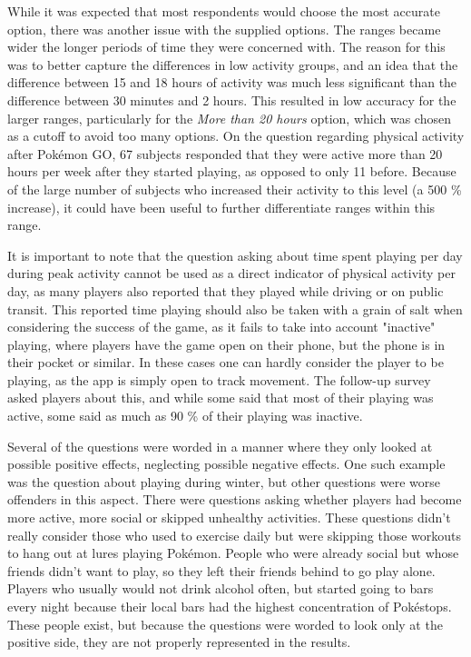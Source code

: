 While it was expected that most respondents would choose the most accurate option, there was another issue with the supplied options. The ranges became wider the longer periods of time they were concerned with. The reason for this was to better capture the differences in low activity groups, and an idea that the difference between 15 and 18 hours of activity was much less significant than the difference between 30 minutes and 2 hours. This resulted in low accuracy for the larger ranges, particularly for the \emph{More than 20 hours} option, which was chosen as a cutoff to avoid too many options. On the question regarding physical activity after Pokémon GO, 67 subjects responded that they were active more than 20 hours per week after they started playing, as opposed to only 11 before. Because of the large number of subjects who increased their activity to this level (a 500 \% increase), it could have been useful to further differentiate ranges within this range. 

It is important to note that the question asking about time spent playing per day during peak activity cannot be used as a direct indicator of physical activity per day, as many players also reported that they played while driving or on public transit. This reported time playing should also be taken with a grain of salt when considering the success of the game, as it fails to take into account "inactive" playing, where players have the game open on their phone, but the phone is in their pocket or similar. In these cases one can hardly consider the player to be playing, as the app is simply open to track movement. The follow-up survey asked players about this, and while some said that most of their playing was active, some said as much as 90 \% of their playing was inactive. 

Several of the questions were worded in a manner where they only looked at possible positive effects, neglecting possible negative effects. One such example was the question about playing during winter, but other questions were worse offenders in this aspect. There were questions asking whether players had become more active, more social or skipped unhealthy activities. These questions didn't really consider those who used to exercise daily but were skipping those workouts to hang out at lures playing Pokémon. People who were already social but whose friends didn't want to play, so they left their friends behind to go play alone. Players who usually would not drink alcohol often, but started going to bars every night because their local bars had the highest concentration of Pokéstops. These people exist, but because the questions were worded to look only at the positive side, they are not properly represented in the results.

